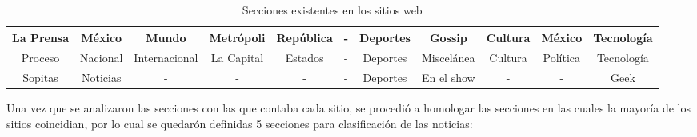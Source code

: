 \begin{table}[H]
{\begin{tabular}{|c|c|c|c|c|c|c|c|c|c|c|}
La Prensa                                                               & México                                                    & Mundo                                                         & Metrópoli                                                 & República                                                  & -                                                          & Deportes                        & Gossip                              & Cultura                                                        & México                                                        & Tecnología                                                                             \\ \hline
Proceso                                                                 & Nacional                                                  & Internacional                                                 & La Capital                                                & Estados                                                    & -                                                          & Deportes                        & Miscelánea                          & Cultura                                                        & Política                                                      & Tecnología                                                                             \\ \hline
Sopitas                                                                 & Noticias                                                  & -                                                             & -                                                         & -                                                          & -                                                          & Deportes                        & En el show                          & -                                                              & -                                                             & Geek                                                                                   \\ \hline
\end{tabular}
}
\caption[Secciones de los sitios web]{Secciones existentes en los sitios web}
\label{tabla:sitiosW}
\end{table}

Una vez que se analizaron las secciones con las que contaba cada sitio, se procedió a homologar las secciones en las cuales la mayoría de los sitios coincidian, por lo cual se quedarón definidas 5 secciones para clasificación de las noticias:


